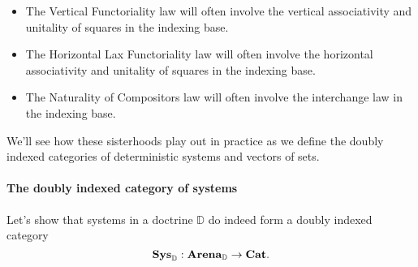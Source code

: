 \documentclass[DynamicalBook]{subfiles}
\begin{document}
\begin{itemize}
  \item The Vertical Functoriality law will often involve the vertical
    associativity and unitality of squares in the indexing base.
  \item The Horizontal Lax Functoriality law will often involve the horizontal
    associativity and unitality of squares in the indexing base.
  \item The Naturality of Compositors law will often involve the interchange law
    in the indexing base.
\end{itemize}

We'll see how these sisterhoods play out in practice as we define the doubly
indexed categories of deterministic systems and vectors of sets.

\paragraph{The doubly indexed category of systems}

Let's show that systems in a doctrine $\mathbb{D}$ do indeed form a doubly indexed category
$$\textbf{Sys}_{\mathbb{D}} : \textbf{Arena}_{\mathbb{D}} \to \textbf{Cat}.$$
\end{document}
